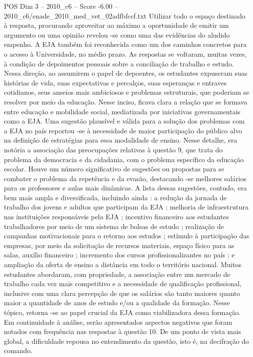 \begin{textsample}{POS Dim 3 – 2010\_c6 – Score -6.00 – 2010\_c6/enade\_2010\_med\_vet\_02adfbfccf.txt}
Utilizar todo o espaço destinado à resposta, procurando aproveitar ao máximo a oportunidade de emitir um argumento ou uma opinião revelou -se como uma das evidências do aludido empenho.
A EJA também foi reconhecida como um dos caminhos concretos para o acesso à Universidade, no médio prazo.
As respostas se voltaram, muitas vezes, à condição de depoimentos pessoais sobre a conciliação de trabalho e estudo.
Nessa direção, ao assumirem o papel de depoentes, os estudantes expuseram suas histórias de vida, suas expectativas e percalços, suas esperanças e entraves cotidianos, seus anseios mais ambiciosos e problemas estruturais, que poderiam se resolver por meio da educação.
Nesse inciso, ficava clara a relação que se formava entre educação e mobilidade social, mediatizada por iniciativas governamentais como a EJA.
Uma sugestão plausível e válida para a solução dos problemas com a EJA no país reportou -se à necessidade de maior participação do público alvo na definição de estratégias para essa modalidade de ensino.
Nesse detalhe, era notória a associação das preocupações relativas à questão 9, que trata do problema da democracia e da cidadania, com o problema específico da educação escolar.
Houve um número significativo de sugestões ou propostas para se combater o problema da repetência e da evasão, destacando -se melhores salários para os professores e aulas mais dinâmicas.
A lista dessas sugestões, contudo, era bem mais ampla e diversificada, incluindo ainda : a redução da jornada de trabalho dos jovens e adultos que participam da EJA ; melhoria de infraestrutura nas instituições responsáveis pela EJA ; incentivo financeiro aos estudantes trabalhadores por meio de um sistema de bolsas de estudo ; realização de campanhas motivacionais para o retorno aos estudos ; estímulo à participação das empresas, por meio da solicitação de recursos materiais, espaço físico para as salas, auxílio financeiro ; incremento dos cursos profissionalizantes no país ; e ampliação da oferta de ensino a distância em todo o território nacional.
Muitos estudantes abordaram, com propriedade, a associação entre um mercado de trabalho cada vez mais competitivo e a necessidade de qualificação profissional, inclusive com uma clara percepção de que os salários são tanto maiores quanto maior a quantidade de anos de estudo e/ou a qualidade da formação.
Nesse tópico, retorna -se ao papel crucial da EJA como viabilizadora dessa formação.
Em continuidade à análise, serão apresentados aspectos negativos que foram notados com frequência nas respostas à questão 10.
De um ponto de vista mais global, a dificuldade repousa no entendimento da questão, isto é, na decifração do comando.

\end{textsample}
